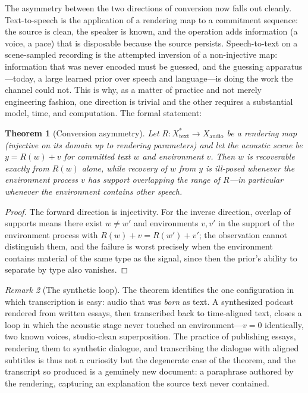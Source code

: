 \documentclass[11pt,oneside]{book}
\theoremstyle{plain}
\newtheorem{theorem}{Theorem}[chapter]
\theoremstyle{definition}
\theoremstyle{remark}
\newtheorem{remark}[theorem]{Remark}
\begin{document}
The asymmetry between the two directions of conversion now falls out cleanly. Text-to-speech is the application of a rendering map to a commitment sequence: the source is clean, the speaker is known, and the operation adds information (a voice, a pace) that is disposable because the source persists. Speech-to-text on a scene-sampled recording is the attempted inversion of a non-injective map: information that was never encoded must be guessed, and the guessing apparatus---today, a large learned prior over speech and language---is doing the work the channel could not. This is why, as a matter of practice and not merely engineering fashion, one direction is trivial and the other requires a substantial model, time, and computation. The formal statement:

\begin{theorem}[Conversion asymmetry]
Let $R : X_{\mathrm{text}}^{*} \to X_{\mathrm{audio}}$ be a rendering map (injective on its domain up to rendering parameters) and let the acoustic scene be $y = R(w) + v$ for committed text $w$ and environment $v$. Then $w$ is recoverable exactly from $R(w)$ alone, while recovery of $w$ from $y$ is ill-posed whenever the environment process $v$ has support overlapping the range of $R$---in particular whenever the environment contains other speech.
\end{theorem}

\begin{proof}
The forward direction is injectivity. For the inverse direction, overlap of supports means there exist $w \neq w'$ and environments $v, v'$ in the support of the environment process with $R(w) + v = R(w') + v'$; the observation cannot distinguish them, and the failure is worst precisely when the environment contains material of the same type as the signal, since then the prior's ability to separate by type also vanishes.
\end{proof}

\begin{remark}[The synthetic loop]
The theorem identifies the one configuration in which transcription is easy: audio that was \emph{born} as text. A synthesized podcast rendered from written essays, then transcribed back to time-aligned text, closes a loop in which the acoustic stage never touched an environment---$v = 0$ identically, two known voices, studio-clean superposition. The practice of publishing essays, rendering them to synthetic dialogue, and transcribing the dialogue with aligned subtitles is thus not a curiosity but the degenerate case of the theorem, and the transcript so produced is a genuinely new document: a paraphrase authored by the rendering, capturing an explanation the source text never contained.
\end{remark}
\end{document}
